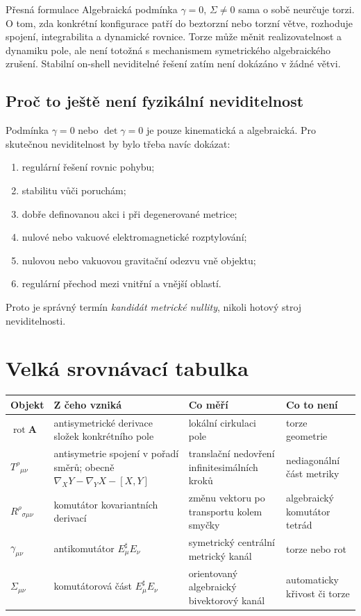 \begin{memorybox}{Přesná formulace}
Algebraická podmínka $\gamma=0$, $\Sigma\neq0$ sama o sobě neurčuje torzi.
O tom, zda konkrétní konfigurace patří do beztorzní nebo torzní větve, rozhoduje
spojení, integrabilita a dynamické rovnice. Torze může měnit realizovatelnost a
dynamiku pole, ale není totožná s mechanismem symetrického algebraického
zrušení. Stabilní on-shell neviditelné řešení zatím není dokázáno v žádné větvi.
\end{memorybox}

\subsection{Proč to ještě není fyzikální neviditelnost}
Podmínka $\gamma=0$ nebo $\det\gamma=0$ je pouze kinematická a algebraická.
Pro skutečnou neviditelnost by bylo třeba navíc dokázat:
\begin{enumerate}[leftmargin=*]
  \item regulární řešení rovnic pohybu;
  \item stabilitu vůči poruchám;
  \item dobře definovanou akci i při degenerované metrice;
  \item nulové nebo vakuové elektromagnetické rozptylování;
  \item nulovou nebo vakuovou gravitační odezvu vně objektu;
  \item regulární přechod mezi vnitřní a vnější oblastí.
\end{enumerate}
Proto je správný termín \emph{kandidát metrické nullity}, nikoli hotový stroj
neviditelnosti.

\section{Velká srovnávací tabulka}

\begin{center}
\small
\renewcommand{\arraystretch}{1.35}
\begin{tabularx}{\textwidth}{>{\bfseries}p{2.5cm}X X X}
\toprule
Objekt & Z čeho vzniká & Co měří & Co to není\\
\midrule
$\operatorname{rot}\mathbf A$ & antisymetrické derivace složek konkrétního pole & lokální cirkulaci pole & torze geometrie\\
$T^\rho{}_{\mu\nu}$ & antisymetrie spojení v pořadí směrů; obecně $\nabla_XY-\nabla_YX-[X,Y]$ & translační nedovření infinitesimálních kroků & nediagonální část metriky\\
$R^\rho{}_{\sigma\mu\nu}$ & komutátor kovariantních derivací & změnu vektoru po transportu kolem smyčky & algebraický komutátor tetrád\\
$\gamma_{\mu\nu}$ & antikomutátor $E_\mu^\sharp E_\nu$ & symetrický centrální metrický kanál & torze nebo rot\\
$\Sigma_{\mu\nu}$ & komutátorová část $E_\mu^\sharp E_\nu$ & orientovaný algebraický bivektorový kanál & automaticky křivost či torze\\
\bottomrule
\end{tabularx}
\end{center}

